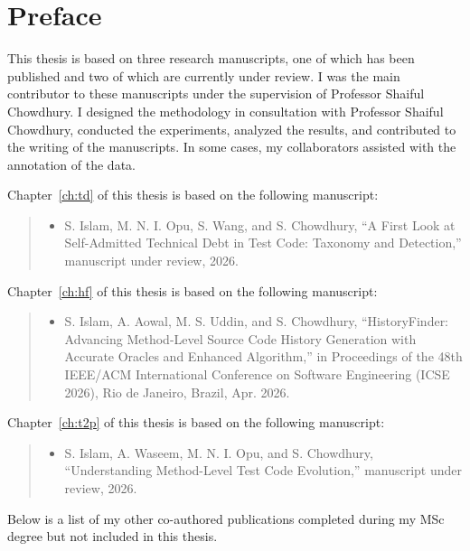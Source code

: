 \chapter*{Preface}

This thesis is based on three research manuscripts, one of which has been published and two of which are currently under review. I was the main contributor to these manuscripts under the supervision of Professor Shaiful Chowdhury. I designed the methodology in consultation with Professor Shaiful Chowdhury, conducted the experiments, analyzed the results, and contributed to the writing of the manuscripts. In some cases, my collaborators assisted with the annotation of the data.

Chapter~\ref{ch:td} of this thesis is based on the following manuscript:
\begin{quote}
\begin{itemize}
    \item S. Islam, M. N. I. Opu, S. Wang, and S. Chowdhury, “A First Look at Self-Admitted Technical Debt in Test Code: Taxonomy and Detection,” manuscript under review, 2026.
    \end{itemize}
\end{quote}

Chapter~\ref{ch:hf} of this thesis is based on the following manuscript:
\begin{quote}
\begin{itemize}
\item S. Islam, A. Aowal, M. S. Uddin, and S. Chowdhury, “HistoryFinder: Advancing Method-Level Source Code History Generation with Accurate Oracles and Enhanced Algorithm,” in Proceedings of the 48th IEEE/ACM International Conference on Software Engineering (ICSE 2026), Rio de Janeiro, Brazil, Apr. 2026.
\end{itemize}
\end{quote}


Chapter~\ref{ch:t2p} of this thesis is based on the following manuscript:

\begin{quote}
\begin{itemize}
\item S. Islam, A. Waseem, M. N. I. Opu, and S. Chowdhury, “Understanding Method-Level Test Code Evolution,” manuscript under review, 2026.
\end{itemize}
\end{quote}


Below is a list of my other co-authored publications completed during my MSc degree but not included in this thesis.

